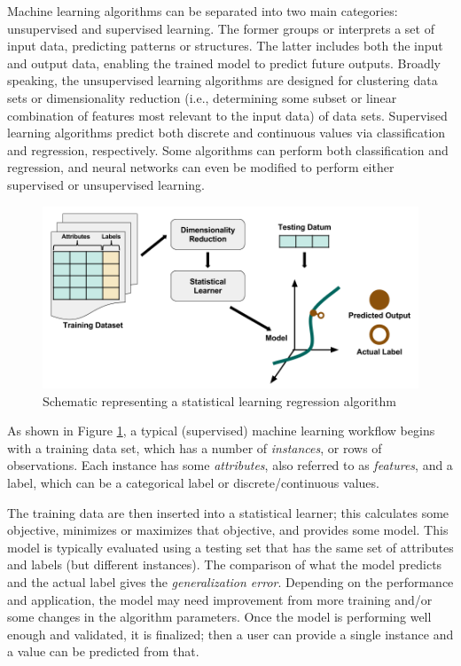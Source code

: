 Machine learning algorithms can be separated into two main categories:
unsupervised and supervised learning.  The former groups or interprets a set of
input data, predicting patterns or structures. The latter includes both the
input and output data, enabling the trained model to predict future outputs.
Broadly speaking, the unsupervised learning algorithms are designed for
clustering data sets or dimensionality reduction (i.e., determining some subset
or linear combination of features most relevant to the input data) of data
sets.  Supervised learning algorithms predict both discrete and continuous
values via classification and regression, respectively. Some algorithms can
perform both classification and regression, and neural networks can even be
modified to perform either supervised or unsupervised learning. 
\\
\begin{figure}[!htb]
  \includegraphics[width=\linewidth]{./chapters/intro/SupervisedRegression.png}
  \caption{Schematic representing a statistical learning regression algorithm}
  \label{fig:supervised}
\end{figure}

As shown in Figure \ref{fig:supervised}, a typical (supervised) machine
learning workflow begins with a training data set, which has a number of
\textit{instances}, or rows of observations.  Each instance has some
\textit{attributes}, also referred to as \textit{features}, and a label, which
can be a categorical label or discrete/continuous values.  

The training data are then inserted into a statistical learner; this calculates
some objective, minimizes or maximizes that objective, and provides some model.
This model is typically evaluated using a testing set that has the same set of
attributes and labels (but different instances). The comparison of what the
model predicts and the actual label gives the \textit{generalization error}.
Depending on the performance and application, the model may need improvement
from more training and/or some changes in the algorithm parameters. Once the
model is performing well enough and validated, it is finalized; then a user can
provide a single instance and a value can be predicted from that. 

